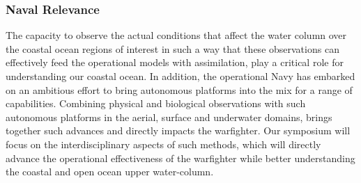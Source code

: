 \subsubsection{Naval Relevance}

The capacity to observe the actual conditions that affect the water
column over the coastal ocean regions of interest in such a way that
these observations can effectively feed the operational models with
assimilation, play a critical role for understanding our coastal
ocean. In addition, the operational Navy has embarked on an ambitious
effort to bring autonomous platforms into the mix for a range of
capabilities. Combining physical and biological observations with such
autonomous platforms in the aerial, surface and underwater domains,
brings together such advances and directly impacts the warfighter. Our
symposium will focus on the interdisciplinary aspects of such methods,
which will directly advance the operational effectiveness of the
warfighter while better understanding the coastal and open ocean upper
water-column.
